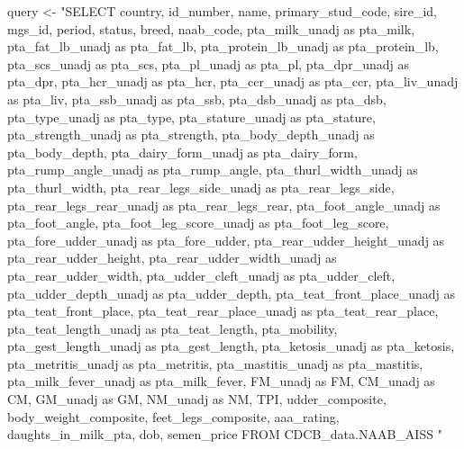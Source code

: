 \documentclass[
]{article}
\newenvironment{Shaded}{\begin{snugshade}}{\end{snugshade}}
\newcommand{\NormalTok}[1]{#1}
\newcommand{\OtherTok}[1]{\textcolor[rgb]{0.56,0.35,0.01}{#1}}
\newcommand{\StringTok}[1]{\textcolor[rgb]{0.31,0.60,0.02}{#1}}
\begin{document}
\begin{Shaded}
\begin{Highlighting}[]
\NormalTok{query }\OtherTok{\textless{}{-}} \StringTok{"SELECT}
\StringTok{  country,}
\StringTok{  id\_number,}
\StringTok{  name,}
\StringTok{  primary\_stud\_code,}
\StringTok{  sire\_id,}
\StringTok{  mgs\_id,}
\StringTok{  period,}
\StringTok{  status,}
\StringTok{  breed,}
\StringTok{  naab\_code,}
\StringTok{  pta\_milk\_unadj as pta\_milk,}
\StringTok{  pta\_fat\_lb\_unadj as pta\_fat\_lb,}
\StringTok{  pta\_protein\_lb\_unadj as pta\_protein\_lb,}
\StringTok{  pta\_scs\_unadj as pta\_scs,}
\StringTok{  pta\_pl\_unadj as pta\_pl,}
\StringTok{  pta\_dpr\_unadj as pta\_dpr,}
\StringTok{  pta\_hcr\_unadj as pta\_hcr,}
\StringTok{  pta\_ccr\_unadj as pta\_ccr,}
\StringTok{  pta\_liv\_unadj as pta\_liv,}
\StringTok{  pta\_ssb\_unadj as pta\_ssb,}
\StringTok{  pta\_dsb\_unadj as pta\_dsb,}
\StringTok{  pta\_type\_unadj as pta\_type,}
\StringTok{  pta\_stature\_unadj as pta\_stature,}
\StringTok{  pta\_strength\_unadj as pta\_strength,}
\StringTok{  pta\_body\_depth\_unadj as pta\_body\_depth,}
\StringTok{  pta\_dairy\_form\_unadj as pta\_dairy\_form,}
\StringTok{  pta\_rump\_angle\_unadj as pta\_rump\_angle,}
\StringTok{  pta\_thurl\_width\_unadj as pta\_thurl\_width,}
\StringTok{  pta\_rear\_legs\_side\_unadj as pta\_rear\_legs\_side,}
\StringTok{  pta\_rear\_legs\_rear\_unadj as pta\_rear\_legs\_rear,}
\StringTok{  pta\_foot\_angle\_unadj as pta\_foot\_angle,}
\StringTok{  pta\_foot\_leg\_score\_unadj as pta\_foot\_leg\_score,}
\StringTok{  pta\_fore\_udder\_unadj as pta\_fore\_udder,}
\StringTok{  pta\_rear\_udder\_height\_unadj as pta\_rear\_udder\_height,}
\StringTok{  pta\_rear\_udder\_width\_unadj as pta\_rear\_udder\_width,}
\StringTok{  pta\_udder\_cleft\_unadj as pta\_udder\_cleft,}
\StringTok{  pta\_udder\_depth\_unadj as pta\_udder\_depth,}
\StringTok{  pta\_teat\_front\_place\_unadj as pta\_teat\_front\_place,}
\StringTok{  pta\_teat\_rear\_place\_unadj as pta\_teat\_rear\_place,}
\StringTok{  pta\_teat\_length\_unadj as pta\_teat\_length,}
\StringTok{  pta\_mobility,}
\StringTok{  pta\_gest\_length\_unadj as pta\_gest\_length,}
\StringTok{  pta\_ketosis\_unadj as pta\_ketosis,}
\StringTok{  pta\_metritis\_unadj as pta\_metritis,}
\StringTok{  pta\_mastitis\_unadj as pta\_mastitis,}
\StringTok{  pta\_milk\_fever\_unadj as pta\_milk\_fever,}
\StringTok{  FM\_unadj as FM,}
\StringTok{  CM\_unadj as CM,}
\StringTok{  GM\_unadj as GM,}
\StringTok{  NM\_unadj as NM,}
\StringTok{  TPI,}
\StringTok{  udder\_composite, }
\StringTok{  body\_weight\_composite,}
\StringTok{  feet\_legs\_composite,}
\StringTok{  aaa\_rating,}
\StringTok{  daughts\_in\_milk\_pta,}
\StringTok{  dob,}
\StringTok{  semen\_price}
\StringTok{FROM}
\StringTok{  CDCB\_data.NAAB\_AISS}
\StringTok{"}


\end{Highlighting}
\end{Shaded}
\end{document}
